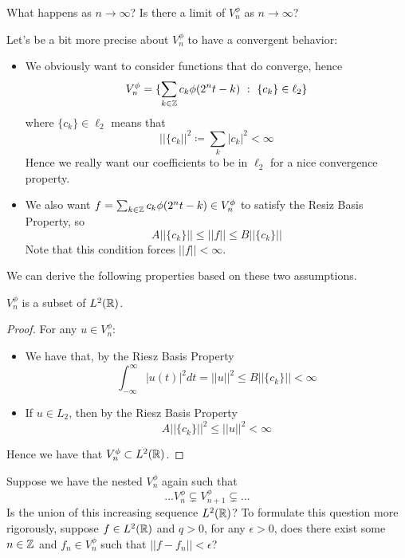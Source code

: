 \documentclass{article}
\begin{document}
\begin{question}
    What happens as $n \to \infty$? Is there a limit of $V_n^\phi$ as $n \to \infty$?
\end{question}

Let's be a bit more precise about $V_n^\phi$ to have a convergent behavior:
\begin{itemize}
    \item We obviously want to consider functions that do converge, hence
\[V_n^\phi = \{\sum_{k \in \mathbb{Z}} c_k \phi(2^n t - k)\ :\ \{c_k\} \in \ell_2\}\]
where $\{c_k\} \in \ell_2$ means that
\[||\{c_k||^2 \coloneqq \sum_k |c_k|^2 < \infty\]
Hence we really want our coefficients to be in $\ell_2$ for a nice convergence property.
    \item We also want $f = \sum_{k \in \mathbb{Z}} c_k \phi(2^n t - k) \in V_n^\phi$ to satisfy the Resiz Basis Property, so
    \[A ||\{c_k\}|| \leq ||f|| \leq B ||\{c_k\}||\]
    Note that this condition forces $||f|| < \infty$.
\end{itemize}

We can derive the following properties based on these two assumptions.

\begin{proposition}
$V_n^\phi$ is a subset of $L^2(\mathbb{R})$.
\end{proposition}

\begin{proof}
    For any $u \in V_n^\phi$:
    \begin{itemize}
        \item We have that, by the Riesz Basis Property
    \[\int_{-\infty}^\infty |u(t)|^2 dt = ||u||^2 \leq B ||\{c_k\}|| < \infty\]
        \item If $u \in L_2$, then by the Riesz Basis Property
    \[A ||\{c_k\}||^2 \leq ||u||^2 < \infty\]
    \end{itemize}
    Hence we have that $V_n^\phi \subset L^2(\mathbb{R})$.
\end{proof}

\begin{question}
    Suppose we have the nested $V_n^\phi$ again such that
    \[... V_{n}^\phi \subsetneq V_{n+1}^\phi \subsetneq ...\]
    Is the union of this increasing sequence $L^2(\mathbb{R})$? To formulate this question more rigorously, suppose $f \in L^2(\mathbb{R})$ and $q > 0$, for any $\epsilon > 0$, does there exist some $n \in \mathbb{Z}$ and $f_n \in V_n^\phi$ such that $||f - f_n|| < \epsilon$?
\end{question}
\end{document}
